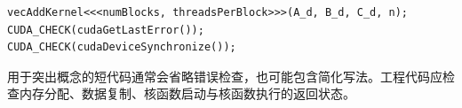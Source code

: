 \par\noindent\begin{minipage}{\linewidth}
\begin{lstlisting}[style=cuda,numbers=none]
vecAddKernel<<<numBlocks, threadsPerBlock>>>(A_d, B_d, C_d, n);
CUDA_CHECK(cudaGetLastError());
CUDA_CHECK(cudaDeviceSynchronize());
\end{lstlisting}
\end{minipage}\par

\begin{warningbox}[title={简化示例与工程代码的区别}]
用于突出概念的短代码通常会省略错误检查，也可能包含简化写法。工程代码应检查内存分配、数据复制、核函数启动与核函数执行的返回状态。
\end{warningbox}

